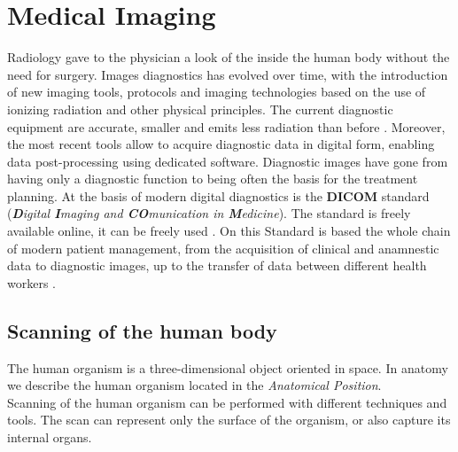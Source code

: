 
\chapter{ Medical Imaging} %

\label{Chapter2} %
 
 
 
Radiology gave to the physician a look of the inside the human body without the need for surgery. Images diagnostics has evolved over time, with the introduction of new imaging tools, protocols and imaging technologies based on the use of ionizing radiation and other physical principles. The current diagnostic equipment are accurate, smaller and emits less radiation than before . Moreover, the most recent tools allow to acquire diagnostic data in digital form, enabling data post-processing using dedicated software. Diagnostic images have gone from having only a diagnostic function to being often the basis for the treatment planning.
At the basis of modern digital diagnostics is the \textbf{DICOM} standard (\emph{\textbf{D}igital \textbf{I}maging and \textbf{CO}munication in \textbf{M}edicine}). The standard is freely available online, it can be freely used \parencite{Reference27}. On this Standard is based the whole chain of modern patient management, from the acquisition of clinical and anamnestic data to diagnostic images, up to the transfer of data between different health workers \parencite{Reference25}.

\section{Scanning of the human body}
The human organism is a three-dimensional object oriented in space. In anatomy we describe the human organism located in the \emph{Anatomical Position}.\\
Scanning of the human organism can be performed with different techniques and tools. The scan can represent only the surface of the organism, or also capture its internal organs.

